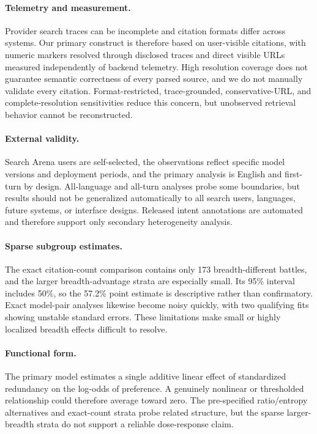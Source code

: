 \documentclass[sigconf,natbib=true,anonymous=true]{acmart}
\begin{document}
\paragraph{Telemetry and measurement.}
Provider search traces can be incomplete and citation formats differ across systems. Our primary construct is therefore based on user-visible citations, with numeric markers resolved through disclosed traces and direct visible URLs measured independently of backend telemetry. High resolution coverage does not guarantee semantic correctness of every parsed source, and we do not manually validate every citation. Format-restricted, trace-grounded, conservative-URL, and complete-resolution sensitivities reduce this concern, but unobserved retrieval behavior cannot be reconstructed.

\paragraph{External validity.}
Search Arena users are self-selected, the observations reflect specific model versions and deployment periods, and the primary analysis is English and first-turn by design. All-language and all-turn analyses probe some boundaries, but results should not be generalized automatically to all search users, languages, future systems, or interface designs. Released intent annotations are automated and therefore support only secondary heterogeneity analysis.

\paragraph{Sparse subgroup estimates.}
The exact citation-count comparison contains only 173 breadth-different battles, and the larger breadth-advantage strata are especially small. Its 95\% interval includes 50\%, so the 57.2\% point estimate is descriptive rather than confirmatory. Exact model-pair analyses likewise become noisy quickly, with two qualifying fits showing unstable standard errors. These limitations make small or highly localized breadth effects difficult to resolve.

\paragraph{Functional form.}
The primary model estimates a single additive linear effect of standardized redundancy on the log-odds of preference. A genuinely nonlinear or thresholded relationship could therefore average toward zero. The pre-specified ratio/entropy alternatives and exact-count strata probe related structure, but the sparse larger-breadth strata do not support a reliable dose-response claim.
\end{document}
